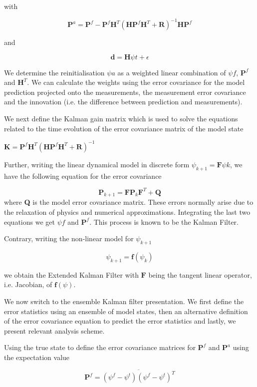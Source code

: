 \documentclass[a4,12pt]{article}
\numberwithin{equation}{section}
\begin{document}
with

$$\textbf{P}^{a} = \textbf{P}^{f} - \textbf{P}^{f}\textbf{H}^{T}(\textbf{HP}^{f}\textbf{H}^{T}+\textbf{R})^{-1}\textbf{HP}^{f} $$

and 

$$\textbf{d} = \textbf{H}\psi{t} + \epsilon$$

We determine the reinitialisation $\psi{a}$ as a weighted linear combination of $\psi{f}$, $\textbf{P}^{f}$ and $\textbf{H}^{T}$. We can calculate the weights using the error covariance for the model prediction projected onto the measurements, the measurement error covariance and the innovation (i.e. the difference between prediction and measurements).     

We next define the Kalman gain matrix which is used to solve the equations related to the time evolution of the error covariance matrix of the model state

$\textbf{K} = \textbf{P}^{f}\textbf{H}^{T}(\textbf{H}\textbf{P}^{f}\textbf{H}^{T}+\textbf{R})^{-1}$

Further, writing the linear dynamical model in discrete form $\psi_{k+1}=\textbf{F}\psi{k}$, we have the following equation for the error covariance

$$\textbf{P}_{k+1}=\textbf{F}\textbf{P}_{k}\textbf{F}^{T}+\textbf{Q}$$
where \textbf{Q} is the model error covariance matrix. These errors normally arise due to the relaxation of physics and numerical approximations. Integrating the last two equations we get $\psi{f}$ and $\textbf{P}^{f}$. This process is known to be the Kalman Filter.

Contrary, writing the non-linear model for $\psi_{k+1}$

$$\psi_{k+1}=\textbf{f}(\psi_{k})$$

we obtain the Extended Kalman Filter with $\textbf{F}$ being the tangent linear operator, i.e. Jacobian, of $\textbf{f}(\psi)$.

We now switch to the ensemble Kalman filter presentation. We first define the error statistics using an ensemble of model states, then an alternative definition of the error covariance equation to predict the error statistics and lastly, we present relevant analysis scheme.

Using the true state to define the error covariance matrices for $\textbf{P}^{f}$ and $\textbf{P}^{a}$ using the expectation value 

$$\textbf{P}^{f} = \overline{(\psi^{f}-\psi^{t})(\psi^{f}-\psi^{t})^{T}}$$
\end{document}
